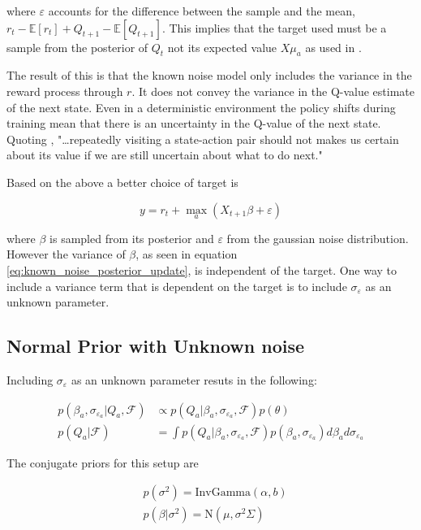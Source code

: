 where $\varepsilon$ accounts for the difference between the sample and the mean, $r_t - \mathbb{E}[r_t] + Q_{t+1} - \mathbb{E}[Q_{t+1}]$. This implies that the target used must be a sample from the posterior of $Q_t$ not its expected value $X\mu_a$ as used in \cite{azziz_2018}. 

The result of this is that the known noise model only includes the variance in the reward process through $r$. It does not convey the variance in the Q-value estimate of the next state. Even in a deterministic environment the policy shifts during training mean that there is an uncertainty in the Q-value of the next state. Quoting \cite{moerland_2017},  "\dots repeatedly visiting a state-action pair should not makes us certain about its value if we are still uncertain about what to do next."

Based on the above a better choice of target is

$$
y = r_t + \max_a (X_{t+1}\beta + \varepsilon)
$$

where $\beta$ is sampled from its posterior and $\varepsilon$ from the gaussian noise distribution. However the variance of $\beta$, as seen in equation \ref{eq:known_noise_posterior_update}, is independent of the target. One way to include a variance term that is dependent on the target is to include $\sigma_{\varepsilon}$ as an unknown parameter.

\subsection{Normal Prior with Unknown noise}

Including $\sigma_{\varepsilon}$ as an unknown parameter resuts in the following:

\begin{align*}
    p(\beta_a, \sigma_{\varepsilon_a}|Q_a, \mathcal{F}) &\propto p(Q_a| \beta_a, \sigma_{\varepsilon_a}, \mathcal{F})p(\theta) \\
    p(Q_a|\mathcal{F}) &= \int p(Q_a|\beta_a, \sigma_{\varepsilon_a}, \mathcal{F}) p(\beta_a, \sigma_{\varepsilon_a})d\beta_a d\sigma_{\varepsilon_a}
\end{align*}

The conjugate priors for this setup are

\begin{align*}
    & p(\sigma^2) = \text{InvGamma}(\alpha, b)          \\
    & p(\beta|\sigma^2) = \text{N}(\mu, \sigma^2\Sigma) 
\end{align*}

